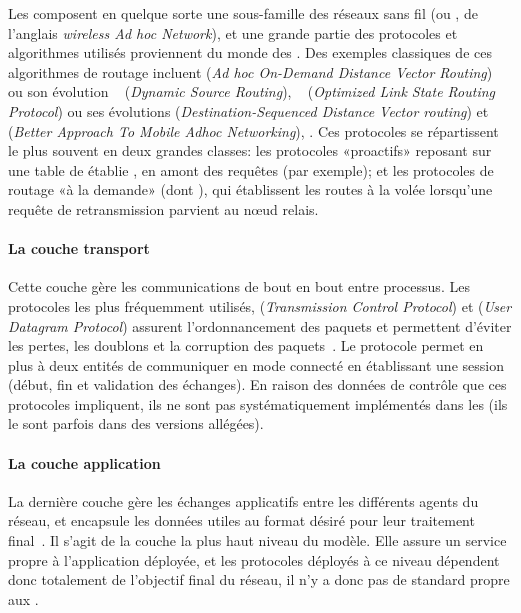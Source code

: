 Les \rcsfs composent en quelque sorte une sous-famille des réseaux sans fil \adhoc (ou \wanet, de l'anglais \textit{wireless Ad hoc Network}), et une grande partie des protocoles et algorithmes utilisés proviennent du monde des \wanet.
Des exemples classiques de ces algorithmes de routage incluent \aodv (\textit{Ad hoc On-Demand Distance Vector Routing})~\cite{aodv} ou son évolution \dsr~\cite{dsr} (\textit{Dynamic Source Routing}), \olsr~\cite{olsr} (\textit{Optimized Link State Routing Protocol}) ou ses évolutions \dsdv (\textit{Destination-Sequenced Distance Vector routing}) et \batman (\textit{Better Approach To Mobile Adhoc Networking}), \etc.
Ces protocoles se répartissent le plus souvent en deux grandes classes: les protocoles «proactifs» reposant sur une table de  établie \apriori, en amont des requêtes (\aodv par exemple); et les protocoles de routage «à la demande» (dont \olsr), qui établissent les routes à la volée lorsqu'une requête de retransmission parvient au nœud relais.

            \paragraph{La couche transport}
Cette couche gère les communications de bout en bout entre processus.
Les protocoles les plus fréquemment utilisés, \tcp (\textit{Transmission Control Protocol}) et \udp (\textit{User Datagram Protocol}) assurent l'ordonnancement des paquets et permettent d'éviter les pertes, les doublons et la corruption des paquets~\cite{TW10}.
Le protocole \tcp permet en plus à deux entités de communiquer en mode connecté en établissant une session (début, fin et validation des échanges).
En raison des données de contrôle que ces protocoles impliquent, ils ne sont pas systématiquement implémentés dans les \rcs (ils le sont parfois dans des versions allégées).

            \paragraph{La couche application}
La dernière couche gère les échanges applicatifs entre les différents agents du réseau, et encapsule les données utiles au format désiré pour leur traitement final~\cite{TW10}.
Il s'agit de la couche la plus haut niveau  du modèle.
Elle assure un service propre à l'application déployée, et les protocoles déployés à ce niveau dépendent donc totalement de l'objectif final du réseau, il n'y a donc pas de standard propre aux \rcs.

